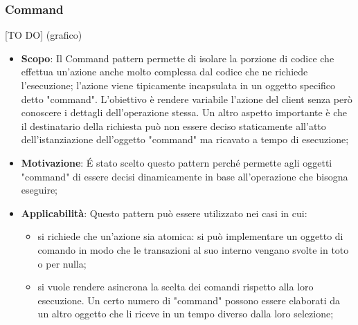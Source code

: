 		\subsubsection{Command} %
		\label{ssub:command}
		[TO DO] (grafico)
		\begin{itemize}
			\item \textbf{Scopo}: Il Command pattern permette di isolare la porzione di codice che effettua un'azione anche molto complessa dal codice che ne richiede l'esecuzione; l'azione viene tipicamente incapsulata in un oggetto specifico detto "command". 
			L'obiettivo è rendere variabile l'azione del client senza però conoscere i dettagli dell'operazione stessa. Un altro aspetto importante è che il destinatario della richiesta può non essere deciso staticamente all'atto dell'istanziazione dell'oggetto "command" ma ricavato a tempo di esecuzione;
			\item \textbf{Motivazione}: \'E stato scelto questo pattern perché permette agli oggetti "command" di essere decisi dinamicamente in base all'operazione che bisogna eseguire;
			\item \textbf{Applicabilità}: Questo pattern può essere utilizzato nei casi in cui:
			\begin{itemize}
			\item si richiede che un'azione sia atomica: si può implementare un oggetto di comando in modo che le transazioni al suo interno vengano svolte in toto o per nulla;
			\item si vuole rendere asincrona la scelta dei comandi rispetto alla loro esecuzione. Un certo numero di "command" possono essere elaborati da un altro oggetto che li riceve in un tempo diverso dalla loro selezione;
			\end{itemize}			

		\end{itemize}



